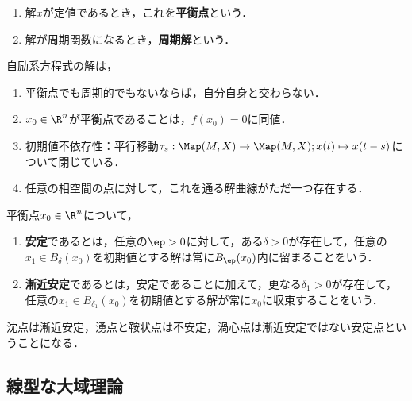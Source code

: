 \documentclass[uplatex,dvipdfmx]{jsreport}
\begin{document}
\begin{definition}\mbox{}
    \begin{enumerate}
        \item 解$x$が定値であるとき，これを\textbf{平衡点}という．
        \item 解が周期関数になるとき，\textbf{周期解}という．
    \end{enumerate}
\end{definition}

\begin{proposition}
    自励系方程式の解は，
    \begin{enumerate}
        \item 平衡点でも周期的でもないならば，自分自身と交わらない．
        \item $x_0\in\R^n$が平衡点であることは，$f(x_0)=0$に同値．
        \item 初期値不依存性：平行移動$\tau_s:\Map(M,X)\to\Map(M,X);x(t)\mapsto x(t-s)$について閉じている．
        \item 任意の相空間の点に対して，これを通る解曲線がただ一つ存在する．
    \end{enumerate}
\end{proposition}

\begin{definition}
    平衡点$x_0\in\R^n$について，
    \begin{enumerate}
        \item \textbf{安定}であるとは，任意の$\ep>0$に対して，ある$\delta>0$が存在して，任意の$x_1\in B_\delta(x_0)$を初期値とする解は常に$B_\ep(x_0)$内に留まることをいう．
        \item \textbf{漸近安定}であるとは，安定であることに加えて，更なる$\delta_1>0$が存在して，任意の$x_1\in B_{\delta_1}(x_0)$を初期値とする解が常に$x_0$に収束することをいう．
    \end{enumerate}
    沈点は漸近安定，湧点と鞍状点は不安定，渦心点は漸近安定ではない安定点ということになる．
\end{definition}

\subsection{線型な大域理論}
\end{document}
